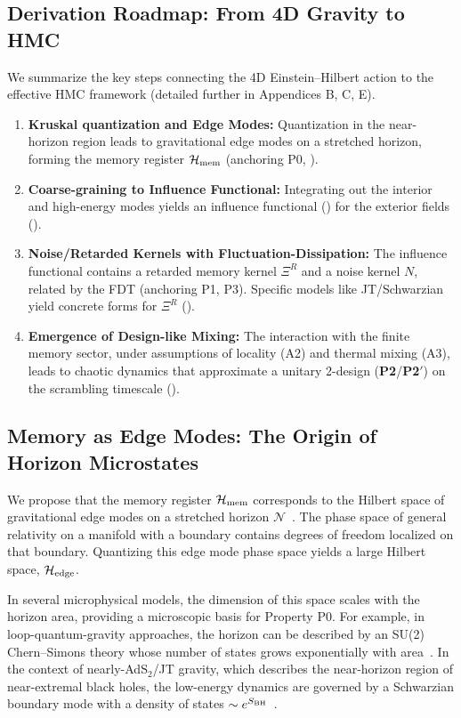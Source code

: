 \documentclass[11pt,a4paper]{article}
\newcommand{\Ptwo}{\textbf{P2}\xspace}
\newcommand{\PtwoPrime}{\textbf{P2$'$}\xspace}
\newcommand{\HMC}{\textsc{HMC}\xspace}
\theoremstyle{plain}
\theoremstyle{definition}
\theoremstyle{remark}
\begin{document}
\subsection{Derivation Roadmap: From 4D Gravity to HMC}
\label{sec:derivation_roadmap}
We summarize the key steps connecting the 4D Einstein--Hilbert action to the effective \HMC{} framework (detailed further in Appendices B, C, E).

\begin{enumerate}[label=(\roman*)]
    \item \textbf{Kruskal quantization and Edge Modes:} Quantization in the near-horizon region leads to gravitational edge modes on a stretched horizon, forming the memory register $\mathcal{H}_{\rm mem}$ (anchoring P0, ).
    \item \textbf{Coarse-graining to Influence Functional:} Integrating out the interior and high-energy modes yields an influence functional () for the exterior fields ().
    \item \textbf{Noise/Retarded Kernels with Fluctuation-Dissipation:} The influence functional contains a retarded memory kernel $\Xi^R$ and a noise kernel $N$, related by the FDT (anchoring P1, P3). Specific models like JT/Schwarzian yield concrete forms for $\Xi^R$ ().
  \item \textbf{Emergence of Design-like Mixing:} The interaction with the finite memory sector, under assumptions of locality (A2) and thermal mixing (A3), leads to chaotic dynamics that approximate a unitary 2-design (\Ptwo/\PtwoPrime) on the scrambling timescale ().
\end{enumerate}

\subsection{Memory as Edge Modes: The Origin of Horizon Microstates}
\label{sec:microstates}
We propose that the memory register $\mathcal{H}_{\rm mem}$ corresponds to the Hilbert space of gravitational edge modes on a stretched horizon $\mathcal{N}$~\cite{tHooft:1985, Susskind:1993, Donnelly:2016, Carlip:2017, HopfmullerFreidel:2018}. The phase space of general relativity on a manifold with a boundary contains degrees of freedom localized on that boundary. Quantizing this edge mode phase space yields a large Hilbert space, $\mathcal{H}_{\rm edge}$.

In several microphysical models, the dimension of this space scales with the horizon area, providing a microscopic basis for Property P0. For example, in loop-quantum-gravity approaches, the horizon can be described by an SU(2) Chern--Simons theory whose number of states grows exponentially with area~\cite{Ashtekar:1998, Engle:2010}. In the context of nearly-AdS$_2$/JT gravity, which describes the near-horizon region of near-extremal black holes, the low-energy dynamics are governed by a Schwarzian boundary mode with a density of states $\sim e^{S_{\rm BH}}$~\cite{Almheiri:2015, Maldacena:2016SYK, MSY:2016, Jensen:2016}.
\end{document}
